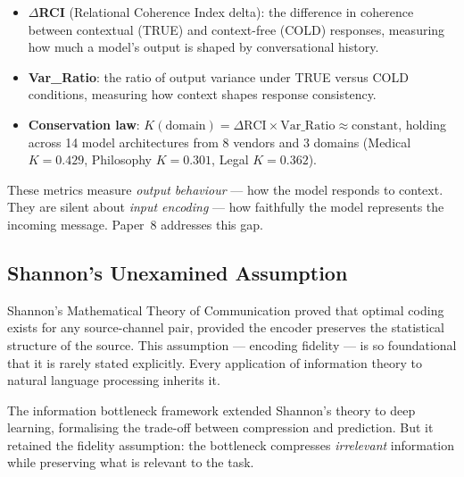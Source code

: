 \documentclass[11pt,a4paper]{article}
\begin{document}
\begin{itemize}
    \item \textbf{$\Delta$RCI} (Relational Coherence Index delta): the difference in coherence between contextual (TRUE) and context-free (COLD) responses, measuring how much a model's output is shaped by conversational history.
    \item \textbf{Var\_Ratio}: the ratio of output variance under TRUE versus COLD conditions, measuring how context shapes response consistency.
    \item \textbf{Conservation law}: $K(\text{domain}) = \Delta\text{RCI} \times \text{Var\_Ratio} \approx \text{constant}$, holding across 14 model architectures from 8 vendors and 3 domains (Medical $K = 0.429$, Philosophy $K = 0.301$, Legal $K = 0.362$).
\end{itemize}

These metrics measure \emph{output behaviour} --- how the model responds to context. They are silent about \emph{input encoding} --- how faithfully the model represents the incoming message. Paper~8 addresses this gap.

\subsection{Shannon's Unexamined Assumption}

Shannon's Mathematical Theory of Communication \citep{shannon1948} proved that optimal coding exists for any source-channel pair, provided the encoder preserves the statistical structure of the source. This assumption --- encoding fidelity --- is so foundational that it is rarely stated explicitly. Every application of information theory to natural language processing inherits it.

The information bottleneck framework \citep{tishby2015} extended Shannon's theory to deep learning, formalising the trade-off between compression and prediction. But it retained the fidelity assumption: the bottleneck compresses \emph{irrelevant} information while preserving what is relevant to the task.
\end{document}
